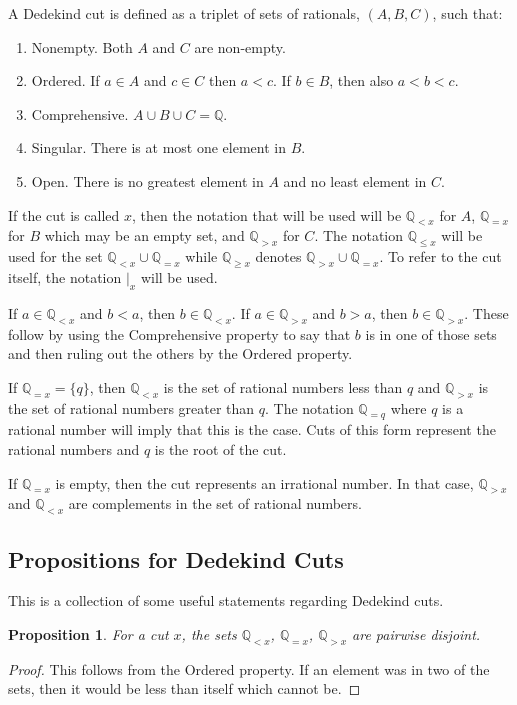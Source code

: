 \documentclass[12pt]{article}
\newtheorem{proposition}{Proposition}[section]
\newcommand{\qcut}[2][x]{\ensuremath{\mathbb{Q}_{#2 #1}}}
\newcommand{\qlt}[1][x]{\qcut[#1]{<}}
\newcommand{\qeq}[1][x]{\qcut[#1]{=}}
\newcommand{\qgt}[1][x]{\qcut[#1]{>}}
\newcommand{\qgeq}[1][x]{\qcut[#1]{\geq}}
\newcommand{\qleq}[1][x]{\qcut[#1]{\leq}}
\newcommand{\cut}[1][x]{{\vert}_{#1} }
\begin{document}
A Dedekind cut is defined as a triplet of sets of rationals, $(A, B, C)$, such that: 
\begin{enumerate}
    \item Nonempty. Both $A$ and $C$ are non-empty.
    \item Ordered. If $a \in A$ and $c \in C$ then $a < c$. If $b \in B$, then also $a < b < c$. 
    \item Comprehensive. $A \cup B \cup C = \mathbb{Q}$.
    \item Singular. There is at most one element in $B$.
    \item Open. There is no greatest element in $A$ and no least element in $C$.
\end{enumerate}
If the cut is called $x$, then the notation that will be used will be $\qlt$ for $A$, $\qeq$ for $B$ which may be an empty set, and $\qgt$ for $C$. The notation $\qleq$ will be used for the set $\qlt \cup \qeq$ while $\qgeq$ denotes $\qgt \cup \qeq$. To refer to the cut itself, the notation $\cut$ will be used. 

If $a \in \qlt$ and $b < a$, then $b \in \qlt$. If $a \in \qgt$ and $ b > a$, then $b \in \qgt$. These follow by using the Comprehensive property to say that $b$ is in one of those sets and then ruling out the others by the Ordered property. 

If $\qeq = \{q\}$, then $\qlt$ is the set of rational numbers less than $q$ and $\qgt$ is the set of rational numbers greater than $q$. The notation $\qeq[q]$ where $q$ is a rational number will imply that this is the case. Cuts of this form represent the rational numbers and $q$ is the root of the cut. 

If $\qeq$ is empty, then the cut represents an irrational number. In that case, $\qgt$ and $\qlt$ are complements in the set of rational numbers. 


\subsection{Propositions for Dedekind Cuts}

This is a collection of some useful statements regarding Dedekind cuts. 

\begin{proposition}
    For a cut $x$, the sets $\qlt$, $\qeq$, $\qgt$ are pairwise disjoint. 
\end{proposition}

\begin{proof}
    This follows from the Ordered property. If an element was in two of the sets, then it would be less than itself which cannot be. 
\end{proof}
\end{document}
